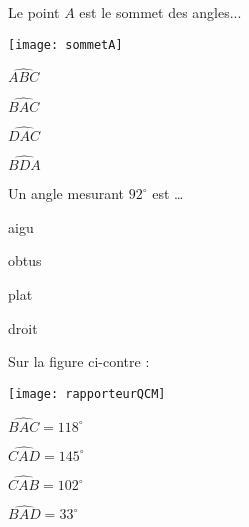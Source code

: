 \begin{QCM}
\begin{GroupeQCM}
     \begin{exercice}
     Le point $A$ est le sommet des angles... \vspace{-2em}\begin{center}\texttt{[image: sommetA]}\end{center}\vspace{-1em}
      \begin{ChoixQCM}{4}
      \item $\widehat{ABC}$
      \item $\widehat{BAC}$
      \item $\widehat{DAC}$
      \item $\widehat{BDA}$
      \end{ChoixQCM}
\begin{corrige}
   \end{corrige}
    \end{exercice}
    
    
     \begin{exercice}
     Un angle mesurant $92^\circ$ est \ldots
      \begin{ChoixQCM}{4}
      \item aigu
      \item obtus
      \item plat
      \item droit
      \end{ChoixQCM}
\begin{corrige}
   \end{corrige}
    \end{exercice}
    
    
     \begin{exercice}
     Sur la figure ci-contre : \vspace{-2em}\begin{center}\texttt{[image: rapporteurQCM]}\end{center}\vspace{-1em}
      \begin{ChoixQCM}{4}
      \item $\widehat{BAC} = 118^\circ$
      \item $\widehat{CAD} = 145^\circ$
      \item $\widehat{CAB} = 102^\circ$
      \item $\widehat{BAD} = 33^\circ$
      \end{ChoixQCM}
\begin{corrige}
   \end{corrige}
    \end{exercice}
    

\end{GroupeQCM}
\end{QCM}
